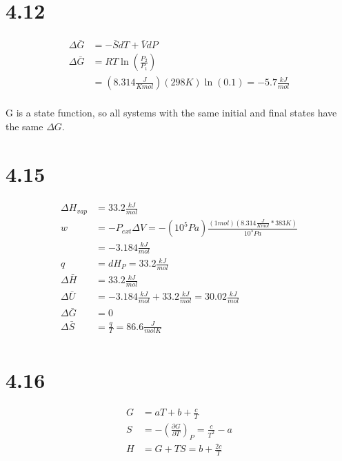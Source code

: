 \documentclass[10pt]{article} %
\begin{document}
\section{4.12}
\begin{align*}
  \Delta \bar{G} &= -\bar{S}dT + \bar{V}dP\\
  \Delta \bar{G} &= RT\ln\left(\frac{P_2}{P_1}\right)\\
  &= (8.314 \frac{J}{K mol})(298K)\ln(0.1) = -5.7 \frac{kJ}{mol}\\
\end{align*}

G is a state function, so all systems with the same initial and final states have the same $\Delta G$.

\section{4.15}
\begin{align*}
  \Delta H_{vap} &= 33.2 \frac{kJ}{mol}\\
  w &= -P_{ext}\Delta V = -(10^5 Pa)\frac{(1 mol)(8.314 \frac{J}{K mol} * 383 K)}{10^5 Pa}\\
  &= -3.184 \frac{kJ}{mol}\\
  q &= dH_P = 33.2 \frac{kJ}{mol}\\
  \Delta \bar{H} &= 33.2 \frac{kJ}{mol}\\
  \Delta \bar{U} &= -3.184 \frac{kJ}{mol} + 33.2 \frac{kJ}{mol} = 30.02 \frac{kJ}{mol}\\
  \Delta \bar{G} &= 0\\
  \Delta \bar{S} &= \frac{q}{T} = 86.6 \frac{J}{mol K}\\
\end{align*}

\section{4.16}
\begin{align*}
  G &= aT + b + \frac{c}{T}\\
  S &= -\left(\frac{\partial G}{\partial T}\right)_P = \frac{c}{T^2} - a\\
  H &= G + TS = b + \frac{2c}{T}\\
\end{align*}
\end{document}
